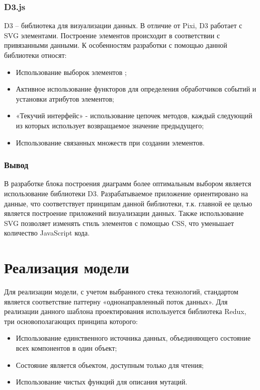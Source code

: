 \subsubsection{D3.js} \label{sec:d3}

D3 -- библиотека для визуализации данных. В отличие от Pixi, D3 работает с SVG элементами. Построение элементов происходит в соответствии с привязанными данными. К особенностям разработки с помощью данной библиотеки относят:

\begin{itemize}
	\item Использование выборок элементов \cite{d3js};
	\item Активное использование функторов для определения обработчиков событий и установки атрибутов элементов;
	\item «Текучий интерфейс» - использование цепочек методов, каждый следующий из которых использует возвращаемое значение предыдущего;
	\item Использование связанных множеств при создании элементов.
\end{itemize}

\subsubsection{Вывод}

В разработке блока построения диаграмм более оптимальным выбором является использование библиотеки D3. Разрабатываемое приложение ориентировано на данные, что соответствует принципам данной библиотеки, т.к. главной ее целью является построение приложений визуализации данных.  Также использование SVG позволяет изменять стиль элементов с помощью CSS, что уменьшает количество JavaScript кода.

\section{Реализация модели}

Для реализации модели, с учетом выбранного стека технологий, стандартом является соответствие паттерну «однонаправленный поток данных». Для реализации данного шаблона проектирования используется библиотека Redux, три основополагающих принципа которого:

\begin{itemize}
	\item Использование единственного источника данных, объединяющего состояние всех компонентов в один объект;
	\item Состояние является объектом, доступным только для чтения;
	\item Использование чистых функций для описания мутаций.
\end{itemize}

